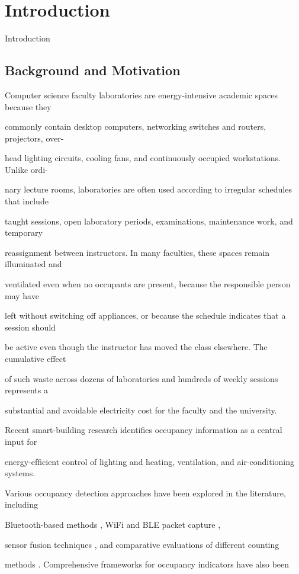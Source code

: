 \chapter{Introduction}
Introduction


\section{Background and Motivation}
Computer science faculty laboratories are energy-intensive academic spaces because they

commonly contain desktop computers, networking switches and routers, projectors, over-

head lighting circuits, cooling fans, and continuously occupied workstations. Unlike ordi-

nary lecture rooms, laboratories are often used according to irregular schedules that include

taught sessions, open laboratory periods, examinations, maintenance work, and temporary

reassignment between instructors. In many faculties, these spaces remain illuminated and

ventilated even when no occupants are present, because the responsible person may have

left without switching off appliances, or because the schedule indicates that a session should

be active even though the instructor has moved the class elsewhere. The cumulative effect

of such waste across dozens of laboratories and hundreds of weekly sessions represents a

substantial and avoidable electricity cost for the faculty and the university.

Recent smart-building research identiﬁes occupancy information as a central input for

energy-efﬁcient control of lighting and heating, ventilation, and air-conditioning systems.

Various occupancy detection approaches have been explored in the literature, including

Bluetooth-based methods \cite{park2018}, WiFi and BLE packet capture \cite{longo2019},

sensor fusion techniques \cite{hobson2019}, and comparative evaluations of different counting

methods \cite{yang2018}. Comprehensive frameworks for occupancy indicators have also been

